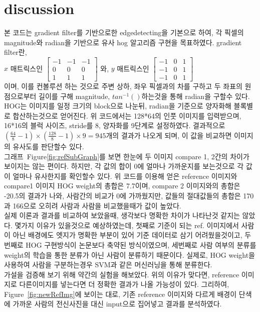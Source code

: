 \documentclass[a4paper]{article}
\begin{document}
\section{discussion}
본 코드는 gradient filter를 기반으로한 edgedetecting을 기본으로 하여, 각 픽셀의 magnitude와 radian을 기반으로 유사 hog 알고리즘 구현을 목표하였다. gradient filter란,\\
$x$ 매트릭스인 
$\begin{bmatrix} 
    -1 & -1 & -1 \\
    0 & 0 & 0 \\
    1 & 1 & 1 
\end{bmatrix}$
\quad
와, $y$ 매트릭스인
$\begin{bmatrix} 
    -1 & 0 & 1\\
    -1 & 0 & 1\\
    -1 & 0 & 1 
\end{bmatrix}$
\\이며, 이를 컨볼루션 하는 것으로 주변 상하, 좌우 픽셀과의 차를 구하고 두 좌표의 원점으로부터 길이를 구해 magnitude, $tan^{-1}()$하는것을 통해 radian을 구할수 있다. \\
HOG는 이미지를 일정 크기의 block으로 나눈뒤, radian을 기준으로 양자화해 블록별로 합산하는것으로 얻어진다. 위 코드에서는 128*64의 인풋 이미지를 입력받으며, 16*16의 블럭 사이즈, stride를 8, 양자화를 9단계로 설정하였다. 결과적으로 $(\frac{64}{8} - 1)\times(\frac{128}{8}-1)\times9=945$개의 결과가 나오게 되며, 이 값을 비교하면 이미지의 유사도를 판단할수 있다.\\
그래프~Figure\ref{fig:refSubGraph}를 보면 한눈에 두 이미지 compare 1, 2간의 차이가 보이지는 않는 편이다. 하지만, 각 값의 합이 0에 얼마나 가까운지를 보는것으로 각 값이 얼마나 유사한지를 확인할수 있다. 위 코드를 이용해 얻은 reference 이미지와 compare1 이미지 HOG weight의 총합은 7.7이며, compare 2 이미지와의 총합은 -20.5의 결과가 나와, 사람간의 비교가 0에 가까웠지만, 값들의 절대값들의 총합은 170과 166으로 오히려 사람과 사람을 비교했을때가 값이 높았다. \\
실제 이론과 결과를 비교하여 보았을때, 생각보다 명확한 차이가 나타난것 같지는 않았다. 몇가지 이유가 있을것으로 예상하였는데, 첫째로 기준이 되는 ref. 이미지에서 사람이 아닌 배경에도 엣지가 명확한 부분이 있어 기준 데이터로 삼기 어려웠을것이고, 두번째로 HOG 구현방식이 논문보다 축약된 방식이였으며, 세번째로 사람 여부의 분류를 weight의 학습을 통한 분류가 아닌 사람이 분류하기 때문이다. 실제로, HOG weight을 사용하여 사람을 구분하는경우 SVM과 같은 머신러닝을 통해 분류한다.\\
가설을 검증해 보기 위해 약간의 실험을 해보았다. 위의 이유가 맞다면, reference 이미지로 다른이미지를 넣는다면 더 정확한 결과가 나올 가능성이 있다. 그리하여, Figure~\ref{fig:newRefImg}에 보이는 대로, 기존 reference 이미지와 다르게 배경이 단색에 가까운 사람의 전신사진을 대신 input으로 집어넣고 결과를 분석하였다.
\end{document}
